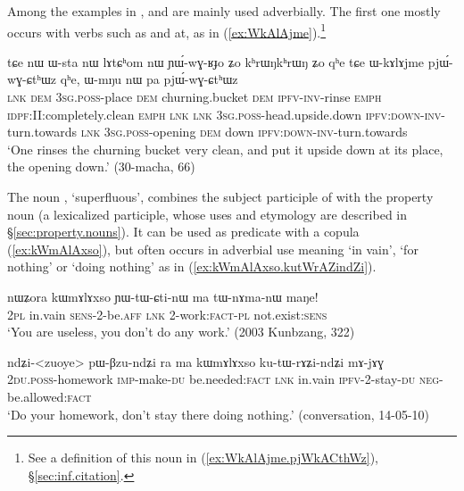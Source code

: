 Among the examples in ,    and    are mainly used adverbially. The first one mostly occurs with verbs such as  and  at, as in (\ref{ex:WkAlAjme}).\footnote{See a definition of this noun in (\ref{ex:WkAlAjme.pjWkACthWz}), §\ref{sec:inf.citation}.}

\begin{exe}
\ex \label{ex:WkAlAjme}
 \gll tɕe nɯ ɯ-sta nɯ lɤtɕʰom nɯ ɲɯ́-wɣ-ʁɟo ʑo kʰrɯŋkʰrɯŋ ʑo qʰe tɕe ɯ-kɤlɤjme pjɯ́-wɣ-ɕtʰɯz qʰe, ɯ-mŋu nɯ pa pjɯ́-wɣ-ɕtʰɯz \\
 \textsc{lnk} \textsc{dem} \textsc{3sg}.\textsc{poss}-place \textsc{dem} churning.bucket \textsc{dem} \textsc{ipfv}-\textsc{inv}-rinse \textsc{emph}  \textsc{idpf}:II:completely.clean \textsc{emph} \textsc{lnk} \textsc{lnk} \textsc{3sg}.\textsc{poss}-head.upside.down \textsc{ipfv}:\textsc{down}-\textsc{inv}-turn.towards \textsc{lnk} \textsc{3sg}.\textsc{poss}-opening \textsc{dem} down   \textsc{ipfv}:\textsc{down}-\textsc{inv}-turn.towards \\
 \glt `One rinses the churning bucket very clean, and put it upside down at its place, the opening down.' (30-macha, 66)
\end{exe}

The noun , `superfluous', combines the subject participle of  with the property noun  (a lexicalized participle, whose uses and etymology are described in §\ref{sec:property.nouns}).  It can be used as predicate with a copula (\ref{ex:kWmAlAxso}), but often occurs in adverbial use meaning `in vain', `for nothing' or `doing nothing' as in (\ref{ex:kWmAlAxso.kutWrAZindZi}). 

\begin{exe}
\ex \label{ex:kWmAlAxso}
 \gll nɯʑora kɯmɤlɤxso ɲɯ-tɯ-ɕti-nɯ ma tɯ-nɤma-nɯ maŋe! \\
 \textsc{2pl} in.vain \textsc{sens}-2-be.\textsc{aff}  \textsc{lnk} 2-work:\textsc{fact}-\textsc{pl} not.exist:\textsc{sens} \\
 \glt `You are useless, you don't do any work.' (2003 Kunbzang, 322)
\end{exe}
 
\begin{exe}
\ex \label{ex:kWmAlAxso.kutWrAZindZi}
 \gll ndʑi-<zuoye> pɯ-βzu-ndʑi ra ma kɯmɤlɤxso ku-tɯ-rɤʑi-ndʑi mɤ-jɤɣ \\
 \textsc{2du}.\textsc{poss}-homework \textsc{imp}-make-\textsc{du} be.needed:\textsc{fact} \textsc{lnk} in.vain  \textsc{ipfv}-2-stay-\textsc{du} \textsc{neg}-be.allowed:\textsc{fact} \\
 \glt `Do your homework, don't stay there doing nothing.' (conversation, 14-05-10)
\end{exe}

